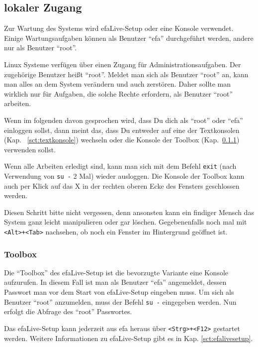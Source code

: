 \documentclass[a4paper,12pt,twoside]{article}
\begin{document}
\subsection{lokaler Zugang}
\label{sct:lokaler_zugang}
Zur Wartung des Systems wird efaLive-Setup
oder eine Konsole verwendet. Einige Wartungsaufgaben können als
Benutzer "`efa"' durchgeführt werden, andere
nur als Benutzer "`root"'.

Linux Systeme verfügen über einen Zugang für Administrationsaufgaben.
Der zugehörige Benutzer heißt "`root"'.
Meldet man sich als Benutzer "`root"' an,
kann man alles an dem System verändern und auch zerstören. Daher sollte
man wirklich nur für Aufgaben, die solche Rechte erfordern, als
Benutzer "`root"' arbeiten.

Wenn im folgenden davon gesprochen wird, dass Du dich als
"`root"' oder "`efa"' einloggen sollst, dann meint das,
dass Du entweder auf eine der Textkonsolen (Kap.
~\ref{sct:textkonsole}) wechseln oder die Konsole der
Toolbox (Kap.~\ref{sct:toolbox}) verwenden sollst.

Wenn alle Arbeiten erledigt sind, kann man sich mit dem Befehl
\texttt{exit} (nach Verwendung von
\texttt{su -} 2 Mal) wieder ausloggen. Die Konsole
der Toolbox kann auch per Klick auf das X in der rechten oberen Ecke
des Fensters geschlossen werden.

Diesen Schritt bitte nicht vergessen, denn ansonsten kann ein findiger
Mensch das System ganz leicht manipulieren oder gar löschen.
Gegebenenfalls noch mal mit
\texttt{{\textless}Alt{\textgreater}+{\textless}Tab{\textgreater}} nachsehen, ob
noch ein Fenster im Hintergrund geöffnet ist.


\subsubsection{Toolbox}
\label{sct:toolbox}
Die "`Toolbox"' des efaLive-Setup ist die
bevorzugte Variante eine Konsole aufzurufen. In diesem Fall ist man als
Benutzer "`efa"' angemeldet, dessen Passwort
man vor dem Start von efaLive-Setup eingeben muss. Um sich als Benutzer
"`root"' anzumelden, muss der Befehl
\texttt{su -} eingegeben werden. Nun erfolgt die
Abfrage des "`root"' Passwortes.

Das efaLive-Setup kann jederzeit aus efa heraus über
\texttt{{\textless}Strg{\textgreater}+{\textless}F12{\textgreater}} gestartet
werden. Weitere Informationen zu efaLive-Setup gibt es in Kap.
\ref{sct:efalivesetup}.
\end{document}

